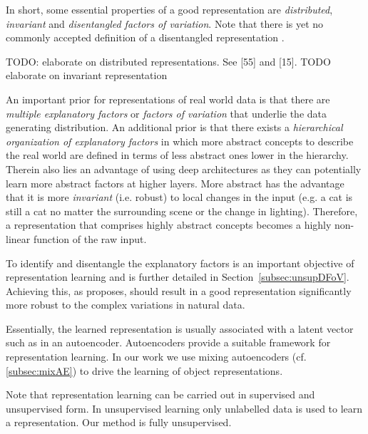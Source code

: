 \documentclass[12pt,a4paper]{article}
\begin{document}
In short, some essential properties of a good representation are \textit{distributed}, \textit{invariant} and \textit{disentangled factors of variation}. Note that there is yet no commonly accepted definition of a disentangled representation \cite{SpatialBDecoder}.

TODO: elaborate on distributed representations. See [55] and [15].
TODO elaborate on invariant representation

An important prior for representations of real world data is that there are \textit{multiple explanatory factors} or \textit{factors of variation} that underlie the data generating distribution. An additional prior is that there exists a \textit{hierarchical organization of explanatory factors} in which more abstract concepts to describe the real world are defined in terms of less abstract ones lower in the hierarchy. Therein also lies an advantage of using deep architectures as they can potentially learn more abstract factors at higher layers. More abstract has the advantage that it is more \textit{invariant} (i.e. robust) to local changes in the input (e.g. a cat is still a cat no matter the surrounding scene or the change in lighting). Therefore, a representation that comprises highly abstract concepts becomes a highly non-linear function of the raw input.

To identify and disentangle the explanatory factors is an important objective of representation learning and is further detailed in Section~\ref{subsec:unsupDFoV}. Achieving this, as \cite{ReprLearning} proposes, should result in a good representation significantly more robust to the complex variations in natural data. 

Essentially, the learned representation is usually associated with a latent vector such as in an autoencoder. Autoencoders provide a suitable framework for representation learning. In our work we use mixing autoencoders (cf. \ref{subsec:mixAE}) to drive the learning of object representations.

Note that representation learning can be carried out in supervised and unsupervised form. In unsupervised learning only unlabelled data is used to learn a representation. Our method is fully unsupervised.


\end{document}
